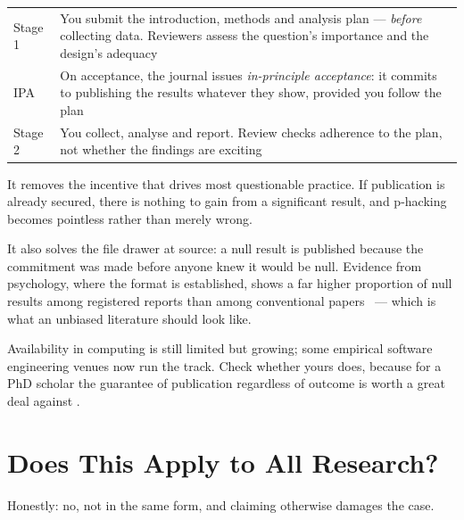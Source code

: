\begin{center}
\small
\begin{tabular}{@{}L{2.2cm}L{12.1cm}@{}}
\toprule
Stage 1 & You submit the introduction, methods and analysis plan ---
          \emph{before} collecting data. Reviewers assess the question's
          importance and the design's adequacy \\
IPA     & On acceptance, the journal issues \emph{in-principle acceptance}: it
          commits to publishing the results whatever they show, provided you
          follow the plan \\
Stage 2 & You collect, analyse and report. Review checks adherence to the plan,
          not whether the findings are exciting \\
\bottomrule
\end{tabular}
\end{center}

\begin{conceptbox}
It removes the incentive that drives most questionable practice. If publication
is already secured, there is nothing to gain from a significant result, and
p-hacking becomes pointless rather than merely wrong.

\medskip
It also solves the file drawer at source: a null result is published because
the commitment was made before anyone knew it would be null. Evidence from
psychology, where the format is established, shows a far higher proportion of
null results among registered reports than among conventional
papers~\cite{chambers2022past} --- which is what an unbiased literature should
look like.

\medskip
Availability in computing is still limited but growing; some empirical software
engineering venues now run the track. Check whether yours does, because for a
PhD scholar the guarantee of publication regardless of outcome is worth a great
deal against .
\end{conceptbox}

\section{Does This Apply to All Research?}

Honestly: no, not in the same form, and claiming otherwise damages the case.

